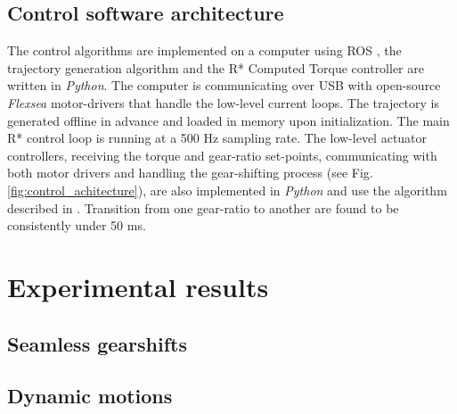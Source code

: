 


\subsection{Control software architecture}
\label{sec:ControlSoftwareArchitecture}

The control algorithms are implemented on a computer using ROS \cite{quigley_ros:_2009}, the trajectory generation algorithm and the R* Computed Torque controller are written in \textit{Python}. The computer is communicating over USB with open-source \textit{Flexsea} motor-drivers \cite{duval_flexsea-execute:_2016} that handle the low-level current loops. The trajectory is generated offline in advance and loaded in memory upon initialization. The main R* control loop is running at a 500 Hz sampling rate. The low-level actuator controllers, receiving the torque and gear-ratio set-points, communicating with both motor drivers and handling the gear-shifting process (see Fig. \ref{fig:control_achitecture}), are also implemented in \textit{Python} and use the algorithm described in \cite{girard_two-speed_2015}. Transition from one gear-ratio to another are found to be consistently under 50 ms.


\section{Experimental results}
\label{sec:ExperimentalResults}




\subsection{Seamless gearshifts}
\label{sec:SeamlessGearshifts}

\subsection{Dynamic motions}
\label{sec:DynamicMotions}


